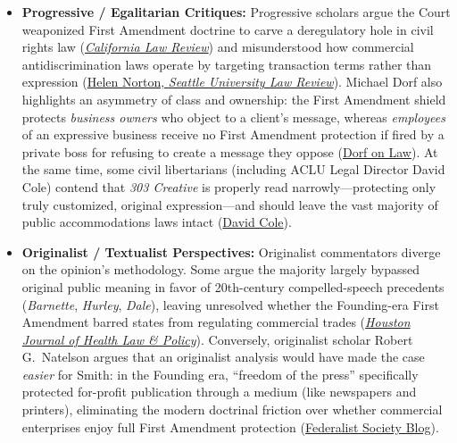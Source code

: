 \documentclass[12pt]{article}
\begin{document}
\begin{itemize}
  \item \textbf{Progressive / Egalitarian Critiques:} Progressive scholars argue the Court weaponized First Amendment doctrine to carve a deregulatory hole in civil rights law (\href{https://www.californialawreview.org/print/equal-right-to-exclude}{\textit{California Law Review}}) and misunderstood how commercial antidiscrimination laws operate by targeting transaction terms rather than expression (\href{https://digitalcommons.law.seattleu.edu/cgi/viewcontent.cgi?article=2909&context=sulr}{Helen Norton, \textit{Seattle University Law Review}}). Michael Dorf also highlights an asymmetry of class and ownership: the First Amendment shield protects \emph{business owners} who object to a client's message, whereas \emph{employees} of an expressive business receive no First Amendment protection if fired by a private boss for refusing to create a message they oppose (\href{https://www.dorfonlaw.org/2022/12/a-selective-preview-of-scotus-oral.html}{Dorf on Law}). At the same time, some civil libertarians (including ACLU Legal Director David Cole) contend that \textit{303 Creative} is properly read narrowly---protecting only truly customized, original expression---and should leave the vast majority of public accommodations laws intact (\href{https://scholarship.law.georgetown.edu/cgi/viewcontent.cgi?article=3596&context=facpub}{David Cole}).
  \item \textbf{Originalist / Textualist Perspectives:} Originalist commentators diverge on the opinion's methodology. Some argue the majority largely bypassed original public meaning in favor of 20th-century compelled-speech precedents (\textit{Barnette}, \textit{Hurley}, \textit{Dale}), leaving unresolved whether the Founding-era First Amendment barred states from regulating commercial trades (\href{https://houstonhealthlaw.scholasticahq.com/article/168216-mahmoud-skrmetti-and-303-creative-ignoring-original-meaning-rewriting-precedent-and-discounting-harm-to-lgbtq-people/attachment/361335.pdf}{\textit{Houston Journal of Health Law \& Policy}}). Conversely, originalist scholar Robert G.\ Natelson argues that an originalist analysis would have made the case \emph{easier} for Smith: in the Founding era, ``freedom of the press'' specifically protected for-profit publication through a medium (like newspapers and printers), eliminating the modern doctrinal friction over whether commercial enterprises enjoy full First Amendment protection (\href{https://fedsoc.org/commentary/fedsoc-blog/with-an-originalist-understanding-of-the-first-amendment-the-303-creative-case-would-have-been-much-easier}{Federalist Society Blog}).

\end{itemize}
\end{document}
